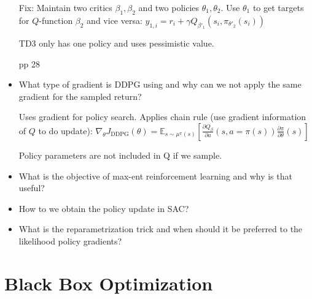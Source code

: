\documentclass[11pt]{scrartcl}
\begin{document}
\begin{itemize}
    Fix: Maintain two critics $\beta_1, \beta_2$ and two policies 
    $\theta_1, \theta_2$. Use $\theta_1$ to get targets for $Q$-function $\beta_2$ and vice versa:
    $y_{1,i} = r_i + \gamma Q_{\beta'_1}(s_i, \pi_{\theta'_2}(s_i)) $

    TD3 only has one policy and uses pessimistic value.

    pp 28

    \item What type of gradient is DDPG using and why can we not apply the same gradient for the sampled 
    return?

    Uses gradient for policy search. Applies chain rule (use gradient
    information of $Q$ to do update):
    $\nabla_\theta J_\mathrm{DDPG}(\theta) = \mathbb{E}_{s\sim \mu^\pi(s)}
    [\frac{\partial Q_\beta}{\partial a}(s, a = \pi(s)) \frac{\partial \pi}{\partial \theta}(s)]$

    Policy parameters are not included in Q if we sample.

    \item What is the objective of max-ent reinforcement learning and why is that useful?

    \item How to we obtain the policy update in SAC?

    \item What is the reparametrization trick and when should it be preferred to the likelihood policy 
    gradients?
\end{itemize}


\section{Black Box Optimization} 
\end{document}

